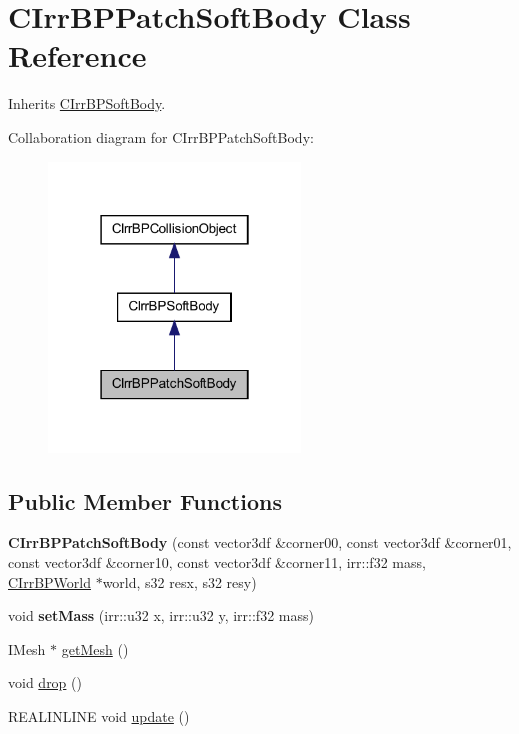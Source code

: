 \hypertarget{class_c_irr_b_p_patch_soft_body}{
\section{CIrrBPPatchSoftBody Class Reference}
\label{class_c_irr_b_p_patch_soft_body}
}


Inherits \hyperlink{class_c_irr_b_p_soft_body}{CIrrBPSoftBody}.



Collaboration diagram for CIrrBPPatchSoftBody:\nopagebreak
\begin{figure}[H]
\begin{center}
\leavevmode
\includegraphics[width=190pt]{class_c_irr_b_p_patch_soft_body__coll__graph}
\end{center}
\end{figure}
\subsection*{Public Member Functions}
\begin{DoxyCompactItemize}
\item 
\hypertarget{class_c_irr_b_p_patch_soft_body_a85c8dd3514e2e41935d72e3574c8a36c}{
{\bfseries CIrrBPPatchSoftBody} (const vector3df \&corner00, const vector3df \&corner01, const vector3df \&corner10, const vector3df \&corner11, irr::f32 mass, \hyperlink{class_c_irr_b_p_world}{CIrrBPWorld} $\ast$world, s32 resx, s32 resy)}
\label{class_c_irr_b_p_patch_soft_body_a85c8dd3514e2e41935d72e3574c8a36c}

\item 
\hypertarget{class_c_irr_b_p_patch_soft_body_a95af55800d2fd343f95893df01324513}{
void {\bfseries setMass} (irr::u32 x, irr::u32 y, irr::f32 mass)}
\label{class_c_irr_b_p_patch_soft_body_a95af55800d2fd343f95893df01324513}

\item 
IMesh $\ast$ \hyperlink{class_c_irr_b_p_patch_soft_body_adecb83ca8f771e8b6ab49499a7765faf}{getMesh} ()
\item 
void \hyperlink{class_c_irr_b_p_patch_soft_body_ac6878f329788dfb13818b1189fbe7a7a}{drop} ()
\item 
REALINLINE void \hyperlink{class_c_irr_b_p_patch_soft_body_a4eaf661dd261ffc1211052fce006b074}{update} ()
\end{DoxyCompactItemize}
